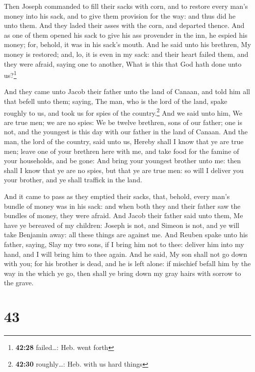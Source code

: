  Then Joseph commanded to fill their sacks with corn, and
to restore every man's money into his sack, and to give them provision
for the way: and thus did he unto them.  And they laded
their asses with the corn, and departed thence.  And as
one of them opened his sack to give his ass provender in the inn, he
espied his money; for, behold, it was in his sack's mouth.
 And he said unto his brethren, My money is restored;
and, lo, it is even in my sack: and their heart failed them, and they
were afraid, saying one to another, What is this that God hath done unto
us?\footnote{\textbf{42:28} failed\ldots: Heb. went forth}

 And they came unto Jacob their father unto the land of
Canaan, and told him all that befell unto them; saying, 
The man, who is the lord of the land, spake roughly to us, and took us
for spies of the country.\footnote{\textbf{42:30} roughly\ldots: Heb.
  with us hard things}  And we said unto him, We are true
men; we are no spies:  We be twelve brethren, sons of our
father; one is not, and the youngest is this day with our father in the
land of Canaan.  And the man, the lord of the country,
said unto us, Hereby shall I know that ye are true men; leave one of
your brethren here with me, and take food for the famine of your
households, and be gone:  And bring your youngest brother
unto me: then shall I know that ye are no spies, but that ye are true
men: so will I deliver you your brother, and ye shall traffick in the
land.

 And it came to pass as they emptied their sacks, that,
behold, every man's bundle of money was in his sack: and when both they
and their father saw the bundles of money, they were afraid.
 And Jacob their father said unto them, Me have ye
bereaved of my children: Joseph is not, and Simeon is not, and ye will
take Benjamin away: all these things are against me.  And
Reuben spake unto his father, saying, Slay my two sons, if I bring him
not to thee: deliver him into my hand, and I will bring him to thee
again.  And he said, My son shall not go down with you;
for his brother is dead, and he is left alone: if mischief befall him by
the way in the which ye go, then shall ye bring down my gray hairs with
sorrow to the grave.

\hypertarget{section-42}{%
\section{43}\label{section-42}}

